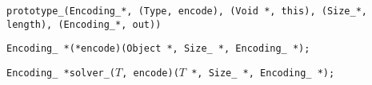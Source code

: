 
\tt{prototype_(Encoding_*, (Type, encode), (Void *, this), (Size_*, length), (Encoding_*, out))}


\tt{Encoding_ *(*encode)(Object *, Size_ *, Encoding_ *);}


\tt{Encoding_ *solver_(}$T$\tt{, encode)(}$T$ \tt{*, Size_ *, Encoding_ *);}
